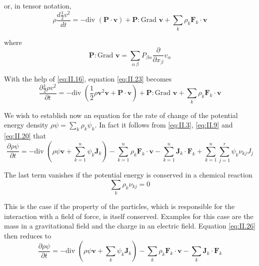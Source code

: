 or, in tensor notation,
\begin{equation}
\rho \frac{d \frac{1}{2} v^2}{d t} = - \textrm{div } \left(\bm{P}\cdot \bm{v}\right)
+
\bm{P} : \textrm{Grad } \bm{v} + \sum_k \rho_k \bm{F}_k \cdot \bm{v}
    \label{eq:II.23}
\end{equation}

where
\begin{equation}
\bm{P} : \textrm{Grad } \bm{v} = \sum_{\alpha\,\beta} P_{\beta \alpha} \frac{\partial}{\partial x_{\beta}} v_{\alpha}
    \label{eq:II.24}
\end{equation}

With the help of \eqref{eq:II.16}, equation \eqref{eq:II.23} becomes
\begin{equation}
\frac{\partial \frac{1}{2} \rho v^2}{\partial t} = 
- \textrm{div } \left(\frac{1}{2} \rho \bm{v}^2 \bm{v} + \bm{P}\cdot \bm{v}\right)
+
\bm{P} : \textrm{Grad } \bm{v} + \sum_k \rho_k \bm{F}_k \cdot \bm{v}
    \label{eq:II.25}
\end{equation}

We wish to establish now an equation for the rate of change of the
potential energy density $\rho \psi = \sum_k \rho_k \psi_k$. In fact it follows from \eqref{eq:II.3}, \eqref{eq:II.9} and \eqref{eq:II.20} that
\begin{equation}
\frac{\partial \rho \psi}{\partial t} = - \textrm{div } \left( \rho \psi \bm{v}  + \sum_{k=1}^n \psi_k \bm{J}_k \right) - \sum_{k=1}^n \rho_k \bm{F}_k \cdot \bm{v} - \sum_{k=1}^n \bm{J}_k \cdot \bm{F}_k + \sum_{k=1}^n\sum_{j=1}^r \psi_k \nu_{kj} J_j
    \label{eq:II.26}
\end{equation}

The last term vanishes if the potential energy is conserved in a
chemical reaction
\begin{equation}
\sum_{k} \rho_k \nu_{kj} = 0
    \label{eq:II.27}
\end{equation}

This is the case if the property of the particles, which is responsible
for the interaction with a field of force, is itself conserved. Examples
for this case are the mass in a gravitational field and the charge in an
electric field. Equation \eqref{eq:II.26} then reduces to
\begin{equation}
\frac{\partial \rho \psi}{\partial t} = - \textrm{div } \left( \rho \psi \bm{v}  + \sum_{k} \psi_k \bm{J}_k \right) - \sum_{k} \rho_k \bm{F}_k \cdot \bm{v} - \sum_{k} \bm{J}_k \cdot \bm{F}_k
    \label{eq:II.28}
\end{equation}

